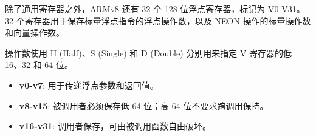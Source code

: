 除了通用寄存器之外，ARMv8 还有 32 个 128 位浮点寄存器，标记为 V0-V31。
32 个寄存器用于保存标量浮点指令的浮点操作数，以及 NEON 操作的标量操作数和向量操作数。

操作数使用 H (Half)、S (Single) 和 D (Double) 分别用来指定 V 寄存器的低 16、32 和 64 位。

\begin{itemize}
  \item
    \textbf{v0-v7}: 用于传递浮点参数和返回值。
  \item
    \textbf{v8-v15}: 被调用者必须保存低 64 位；高 64 位不要求跨调用保持。
  \item
    \textbf{v16-v31}: 调用者保存，可由被调用函数自由破坏。
\end{itemize}
